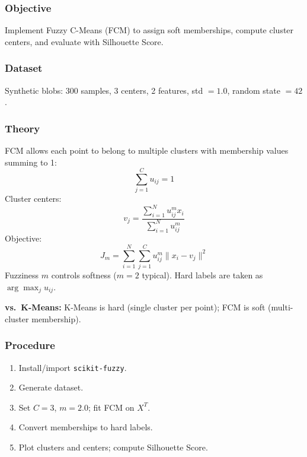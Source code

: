 \documentclass[a4paper,10pt]{article}
\begin{document}
\subsubsection{Objective}
Implement Fuzzy C-Means (FCM) to assign soft memberships, compute cluster centers, and evaluate with Silhouette Score.

\subsubsection{Dataset}
Synthetic blobs: 300 samples, 3 centers, 2 features, std \(=1.0\), random state \(=42\).

\subsubsection{Theory}
FCM allows each point to belong to multiple clusters with membership values summing to 1:
\[
\sum_{j=1}^{C} u_{ij} = 1
\]
Cluster centers:
\[
v_j = \frac{\sum_{i=1}^{N} u_{ij}^{m} x_i}{\sum_{i=1}^{N} u_{ij}^{m}}
\]
Objective:
\[
J_m = \sum_{i=1}^{N} \sum_{j=1}^{C} u_{ij}^{m} \| x_i - v_j \|^2
\]
Fuzziness \(m\) controls softness (\(m=2\) typical). Hard labels are taken as \(\arg\max_j u_{ij}\).

\textbf{vs.\ K-Means:} K-Means is hard (single cluster per point); FCM is soft (multi-cluster membership).

\subsubsection{Procedure}
\begin{enumerate}[nosep]
    \item Install/import \texttt{scikit-fuzzy}.
    \item Generate dataset.
    \item Set \(C=3\), \(m=2.0\); fit FCM on \(X^T\).
    \item Convert memberships to hard labels.
    \item Plot clusters and centers; compute Silhouette Score.
\end{enumerate}
\end{document}
